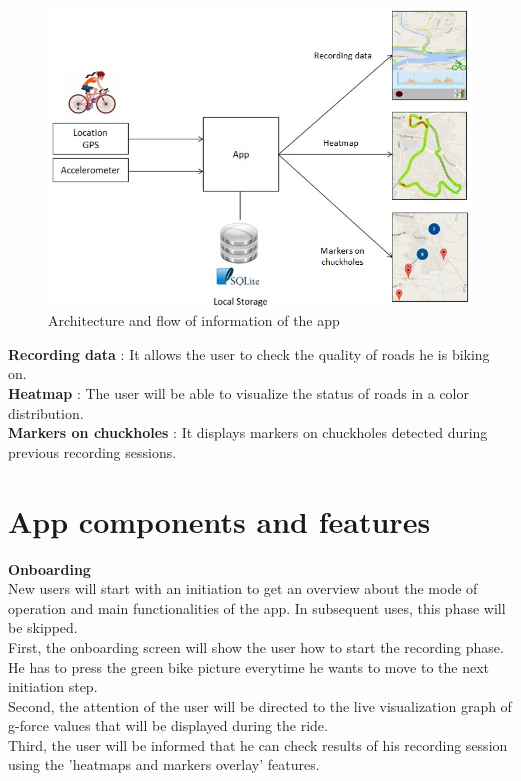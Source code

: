 \documentclass[10pt,a4paper]{article} %
\begin{document}
	\begin{figure}[H]
	\centering
    \includegraphics[scale = 0.8]{pic1}
    \caption{Architecture and flow of information of the app }
		  \label{fig:arch_flow}
    \end{figure}
    \noindent
    \textbf{Recording data} : 
	It allows the user to check the quality of roads he is biking on.\\
	\textbf{Heatmap} : 
	The user will be able to visualize the status of roads in a color distribution.\\
	\textbf{Markers on chuckholes} : 
	It displays markers on chuckholes detected during previous recording sessions.
    
    \section{App components and features}
    
    
    \textbf{Onboarding}\\
    New users will start with an initiation to get an overview about the mode of operation and main functionalities of the app. In subsequent uses, this phase will be skipped.\\
    First, the onboarding screen will show the user how to start the recording phase. He has to press the green bike picture everytime he wants to move to the next initiation step. \\
    Second, the attention of the user will be directed to the live visualization graph of g-force values that will be displayed during the ride.\\
    Third, the user will be informed that he can check results of his recording session using the 'heatmaps and markers overlay' features.
    
\end{document}
